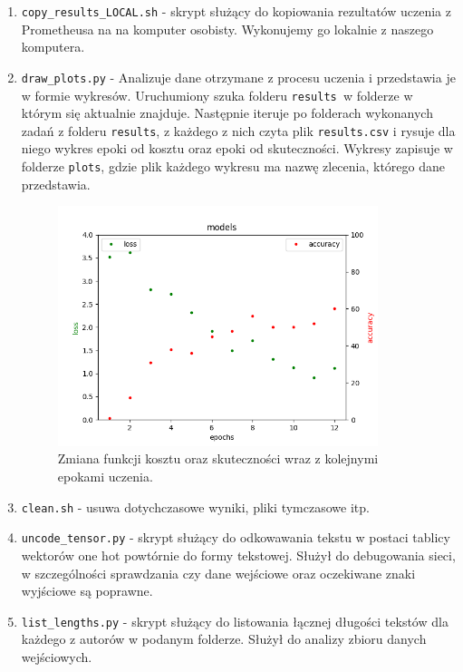 \begin{enumerate}
	\item {\texttt{copy\_results\_LOCAL.sh} } - skrypt służący do kopiowania rezultatów uczenia z Prometheusa na 
	na komputer osobisty. Wykonujemy go lokalnie z naszego komputera. 

	\item {\texttt{draw\_plots.py} } - Analizuje dane otrzymane z procesu uczenia i przedstawia je w formie wykresów.
	Uruchumiony szuka folderu \texttt{results }w folderze w którym się aktualnie znajduje. Następnie iteruje po folderach
	wykonanych zadań z folderu \texttt{results}, z każdego z nich czyta plik \texttt{results.csv} i rysuje dla niego wykres epoki od kosztu
 	oraz epoki od skuteczności. Wykresy zapisuje w folderze \texttt{plots}, gdzie plik każdego wykresu ma nazwę 
 	zlecenia, którego dane przedstawia.
 	 
 	\begin{figure}[H]
	\centering
	\includegraphics[height=7cm]{./images/plot.png}
	\caption{Zmiana funkcji kosztu oraz skuteczności wraz z kolejnymi epokami uczenia.} 
	\label{fig:test5}
	\end{figure}
 	
	
	\item {\texttt{clean.sh} } - usuwa dotychczasowe wyniki, pliki tymczasowe itp.
	
	\item {\texttt{uncode\_tensor.py} } - skrypt służący do odkowawania tekstu w postaci tablicy wektorów one hot powtórnie do 
 	formy tekstowej. Służył do debugowania sieci, w szczególności sprawdzania czy dane wejściowe oraz 
 	oczekiwane znaki wyjściowe są poprawne.
 	
 	\item {\texttt{list\_lengths.py} } - skrypt służący do listowania łącznej długości tekstów dla każdego z autorów
 	w podanym folderze. Służył do analizy zbioru danych wejściowych.
	
	
	
\end{enumerate}



